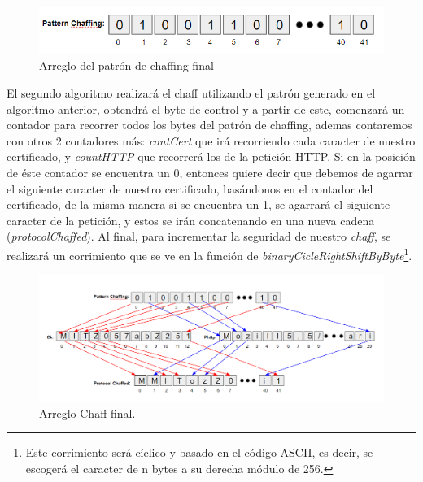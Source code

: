 \documentclass[12pt, a4paper, titlepage]{report}
\begin{document}
    		\begin{figure}[H]
    			\begin{center}	                  \includegraphics[width=14cm]{./imagenes/Desarrollo/Prototipo_2/algorithm1_3.png}
				\caption{Arreglo del patrón de chaffing final}
    			\end{center}
    		\end{figure}
		    
		    
		    
		    El segundo algoritmo realizará el chaff utilizando el patrón generado en el algoritmo anterior, obtendrá el byte de control y a partir de este, comenzará un contador para recorrer todos los bytes del patrón de chaffing, ademas contaremos con otros 2 contadores más: \textit{contCert} que irá recorriendo cada caracter de nuestro certificado, y \textit{countHTTP} que recorrerá los de la petición HTTP. Si en la posición de éste contador se encuentra un 0, entonces quiere decir que debemos de agarrar el siguiente caracter de nuestro certificado, basándonos en el contador del certificado, de la misma manera si se encuentra un 1, se agarrará el siguiente caracter de la petición, y estos se irán concatenando en una nueva cadena (\textit{protocolChaffed}). Al final, para incrementar la seguridad de nuestro \textit{chaff}, se realizará un corrimiento que se ve en la función de \textit{binaryCicleRightShiftByByte}\footnote{Este corrimiento será cíclico y basado en el código ASCII, es decir, se escogerá el caracter de n bytes a su derecha módulo de 256.}.
		    
		    \begin{figure}[H]
    			\begin{center}	                  \includegraphics[width=14cm]{./imagenes/Desarrollo/Prototipo_2/algorithm2_1.png}
				\caption{Arreglo Chaff final.}
    			\end{center}
    		\end{figure}
		    
\end{document}
